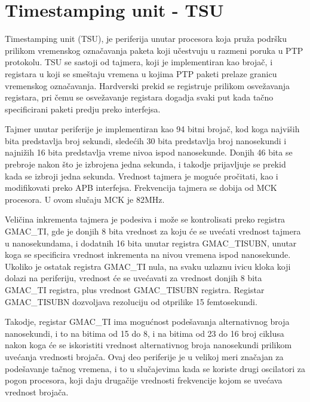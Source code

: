 \documentclass[a4paper,12pt, master]{etf}
\begin{document}
	\section{Timestamping unit - TSU}
	Timestamping unit (TSU), je periferija unutar procesora koja pru\v{z}a
	podr\v{s}ku prilikom vremenskog ozna\v{c}avanja paketa koji u\v{c}estvuju u
	razmeni poruka u PTP protokolu. TSU se sastoji od tajmera, koji je
	implementiran kao broja\v{c}, i registara u koji se sme\v{s}taju vremena u
	kojima PTP paketi prelaze granicu vremenskog ozna\v{c}avanja. Hardverski
	prekid se registruje prilikom osve\v{z}avanja registara, pri \v{c}emu se
	osve\v{z}avanje registara dogadja svaki put kada ta\v{c}no specificirani
	paketi predju preko interfejsa.

	Tajmer unutar periferije je implementiran kao 94 bitni broja\v{c}, kod koga
	najvi\v{s}ih bita predstavlja broj sekundi, slede\'{c}ih 30 bita predstavlja
    broj nanosekundi i najni\v{z}ih 16 bita predstavlja vreme nivoa ispod
    nanosekunde. Donjih 46 bita se prebroje nakon \v{s}to je izbrojena jedna
    sekunda, i takodje prijavljuje se prekid kada se izbroji jedna sekunda.
    Vrednost tajmera je mogu\'{c}e pro\v{c}itati, kao i modifikovati preko APB
    interfejsa. Frekvencija tajmera se dobija od MCK procesora. U ovom
    slu\v{c}aju MCK je 82MHz.

	Veli\v{c}ina inkrementa tajmera je podesiva i mo\v{z}e se kontrolisati
	preko registra GMAC\_TI, gde je donjih 8 bita vrednost za koju \'{c}e se
	uve\'{c}ati vrednost tajmera u nanosekundama, i dodatnih 16 bita unutar
	registra GMAC\_TISUBN, unutar koga se specificira vrednost inkrementa na
	nivou vremena ispod nanosekunde. Ukoliko je ostatak registra GMAC\_TI nula,
	na svaku uzlaznu ivicu kloka koji dolazi na periferiju, vrednost \'{c}e se
	uve\'{c}avati za vrednost donjih 8 bita GMAC\_TI registra, plus vrednost
	GMAC\_TISUBN registra. Registar GMAC\_TISUBN dozvoljava rezoluciju od
	otprilike 15 femtosekundi.

	Takodje, registar GMAC\_TI ima mogu\'{c}nost pode\v{s}avanja alternativnog
	broja nanosekundi, i to na bitima od 15 do 8, i na bitima od 23 do 16 broj
	ciklusa nakon koga \'{c}e se iskoristiti vrednost alternativnog broja
	nanosekundi prilikom uve\'{c}anja vrednosti broja\v{c}a. Ovaj deo
	periferije je u velikoj meri zna\v{c}ajan za pode\v{s}avanje ta\v{c}nog
	vremena, i to u slu\v{c}ajevima kada se koriste drugi oscilatori za pogon
	procesora, koji daju druga\v{c}ije vrednosti frekvencije kojom se
	uve\'{c}ava vrednost broja\v{c}a.
\end{document}
